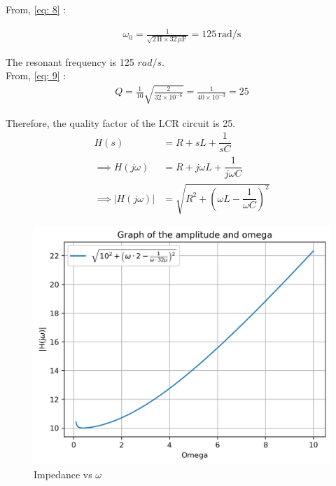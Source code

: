 \documentclass[journal,12pt,twocolumn]{IEEEtran}
\theoremstyle{remark}
\begin{document}
From, \eqref{eq: 8} :

\begin{align}
\omega_0 = \frac{1}{\sqrt{2 \, \text{H} \times 32 \, \mu\text{F}}} = 125 \, \text{rad/s}
\end{align}

The resonant frequency is 125 $rad/s$.\\

From, \eqref{eq: 9} :
\begin{align}
Q = \frac{1}{10}\sqrt{\frac{2}{32 \times 10^{-6}}} = \frac{1}{40 \times 10^{-3}} = 25
\end{align}

Therefore, the quality factor of the LCR circuit is 25.\\


\begin{align}
     H(s) &= R + sL + \dfrac{1}{sC}\\
     \implies H(j\omega) &= R + j\omega L + \dfrac{1}{j\omega C}\\
     \implies \lvert H(j\omega) \rvert &= \sqrt{R^2 + \left(\omega L - \dfrac{1}{\omega C}\right)^2}
\end{align}

\begin{figure}[!h]
    \centering
    \includegraphics[width = \columnwidth]{figs/q_plot.png}
    \caption{Impedance vs $\omega$}
    \label{fig:h_plot}
\end{figure}
\end{document}
